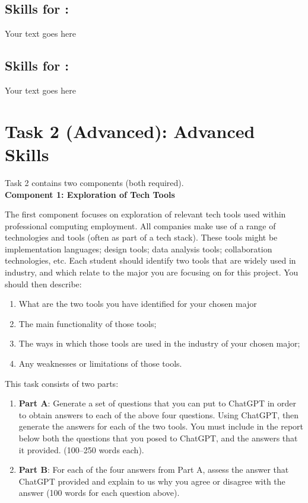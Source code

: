 \documentclass[a4paper, 11pt]{report}
\begin{document}
\subsection{Skills for \majC: \studC}

Your text goes here

\subsection{Skills for \majD: \studD}

Your text goes here



\newpage
\section{Task 2 (Advanced): Advanced Skills}

Task 2 contains two components (both required).\\[2mm]

\textbf{Component 1: Exploration of Tech Tools}

The first component focuses on exploration of relevant tech tools used within professional computing employment. All companies make use of a range of technologies and tools (often as part of a tech stack). These tools might be implementation languages; design tools; data analysis tools; collaboration technologies, etc. Each student should identify two tools that are widely used in industry, and which relate to the major you are focusing on for this project. You should then describe:

\begin{enumerate}
\item What are the two tools you have identified for your chosen major
\item The main functionality of those tools;
\item The ways in which those tools are used in the industry of your chosen major;
\item Any weaknesses or limitations of those tools.
\end{enumerate}

This task consists of two parts:

\begin{enumerate}
\item \textbf{Part A}: Generate a set of questions that you can put to ChatGPT in order to obtain answers to each of the above four questions. Using ChatGPT, then generate the answers for each of the two tools. You must include in the report below both the questions that you posed to ChatGPT, and the answers that it provided.  (100–250 words each).
\item \textbf{Part B}: For each of the four answers from Part A, assess the answer that ChatGPT provided and explain to us why you agree or disagree with the answer (100 words for each question above).
\end{enumerate}
\end{document}
